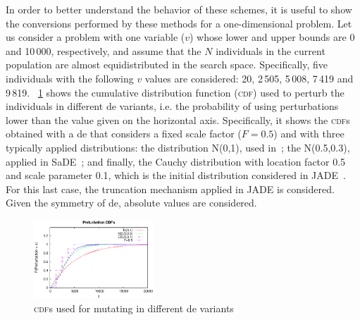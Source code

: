 \documentclass[preprint,3p]{elsarticle}
\newcommand{\DE}{{\sc de}}
\begin{document}
In order to better understand the behavior of these schemes, it is useful to show the conversions performed by these
methods for a one-dimensional problem.
%
Let us consider a problem with one variable ($v$) whose lower and upper bounds are 0 and 10$\,$000, respectively,
and assume that the $N$ individuals in the current population are almost equidistributed in the search space.
%
Specifically, five individuals with the following $v$ values are considered: 20, 2$\,$505, 5$\,$008, 7$\,$419 and 9$\,$819.
%
\figurename~\ref{fig:random_cdfs} shows the cumulative distribution function (\textsc{cdf}) used to perturb the individuals in different \DE{} variants,
i.e. the probability of using perturbations lower than the value given on the horizontal axis.
%
Specifically, it shows the \textsc{cdf}s obtained with a \DE{} that considers a fixed scale factor ($F = 0.5$) and
with three typically applied distributions: the distribution N(0,1), used in~\cite{Abbass:02}; the N(0.5,0.3), applied in SaDE~\cite{Qin:09}; and
finally, the Cauchy distribution with location factor 0.5 and scale parameter 0.1, which is the initial distribution considered in JADE~\cite{Zhang:09}.
%
For this last case, the truncation mechanism applied in JADE is considered.
%
Given the symmetry of \DE{}, absolute values are considered.

\begin{figure}[!t]
\centering
\includegraphics[width=0.40\textwidth]{images/cdf.eps}
\caption{\textsc{cdf}s used for mutating in different \DE{} variants}
\label{fig:random_cdfs}
\end{figure}
\end{document}
